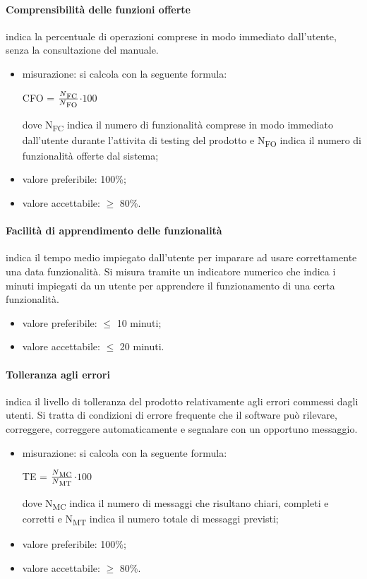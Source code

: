 \paragraph{Comprensibilità delle funzioni offerte}
indica la percentuale di operazioni comprese in modo immediato dall’utente, senza la consultazione del manuale.
	\begin{itemize}
	    \item misurazione: si calcola con la seguente formula: \\
		\centerline{ CFO =  \(\frac{N\textsubscript{FC}}{N\textsubscript{FO}} \)$ \cdot 100$ }
		dove N\textsubscript{FC} indica il numero di funzionalità comprese in modo immediato dall’utente durante l'attivita di testing del 
        prodotto e N\textsubscript{FO} indica il numero di funzionalità offerte dal sistema;
		\item valore preferibile: 100\%;
		\item valore accettabile: $\geq$ 80\%.
	\end{itemize}

    \paragraph{Facilità di apprendimento delle funzionalità}
    indica il tempo medio impiegato dall’utente per imparare ad usare correttamente una data funzionalità. 
    Si misura tramite un indicatore numerico che indica i minuti impiegati da un utente per apprendere il funzionamento di una certa funzionalità.
	\begin{itemize}
		\item valore preferibile: $\leq$ 10 minuti;
		\item valore accettabile: $\leq$ 20 minuti.
	\end{itemize}

    \paragraph{Tolleranza agli errori}
    indica il livello di tolleranza del prodotto relativamente agli errori commessi dagli 
    utenti. Si tratta di condizioni di errore frequente che il software può rilevare, correggere, correggere automaticamente e segnalare con un opportuno messaggio.
	\begin{itemize}
	    \item misurazione: si calcola con la seguente formula: \\
		\centerline{ TE =  \(\frac{N\textsubscript{MC}}{N\textsubscript{MT}} \)$ \cdot 100$ }
		dove N\textsubscript{MC} indica il numero di messaggi che risultano chiari, completi e corretti 
        e N\textsubscript{MT} indica il numero totale di messaggi previsti;
		\item valore preferibile: 100\%;
		\item valore accettabile: $\geq$ 80\%.
	\end{itemize}

